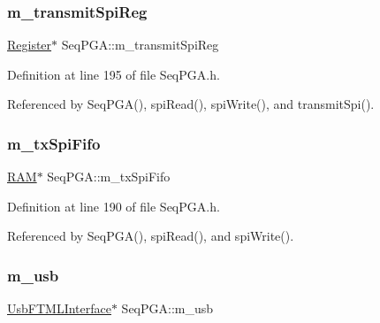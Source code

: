 \mbox{\label{classSeqPGA_a4e0ffb37b1cd947d389354ac25723ab8}} 
\subsubsection{\texorpdfstring{m\+\_\+transmit\+Spi\+Reg}{m\_transmitSpiReg}}
{\footnotesize\ttfamily \hyperlink{classRegister}{Register}$\ast$ Seq\+P\+G\+A\+::m\+\_\+transmit\+Spi\+Reg\hspace{0.3cm}{\ttfamily [private]}}



Definition at line 195 of file Seq\+P\+G\+A.\+h.



Referenced by Seq\+P\+G\+A(), spi\+Read(), spi\+Write(), and transmit\+Spi().

\mbox{\label{classSeqPGA_a6fbdd81928bb5d0fcd671ae2facaef11}} 
\subsubsection{\texorpdfstring{m\+\_\+tx\+Spi\+Fifo}{m\_txSpiFifo}}
{\footnotesize\ttfamily \hyperlink{classRAM}{R\+AM}$\ast$ Seq\+P\+G\+A\+::m\+\_\+tx\+Spi\+Fifo\hspace{0.3cm}{\ttfamily [private]}}



Definition at line 190 of file Seq\+P\+G\+A.\+h.



Referenced by Seq\+P\+G\+A(), spi\+Read(), and spi\+Write().

\mbox{\label{classSeqPGA_a3df81bbe0e75a1287aa6fe9d33ea27f5}} 
\subsubsection{\texorpdfstring{m\+\_\+usb}{m\_usb}}
{\footnotesize\ttfamily \hyperlink{classUsbFTMLInterface}{Usb\+F\+T\+M\+L\+Interface}$\ast$ Seq\+P\+G\+A\+::m\+\_\+usb\hspace{0.3cm}{\ttfamily [private]}}



